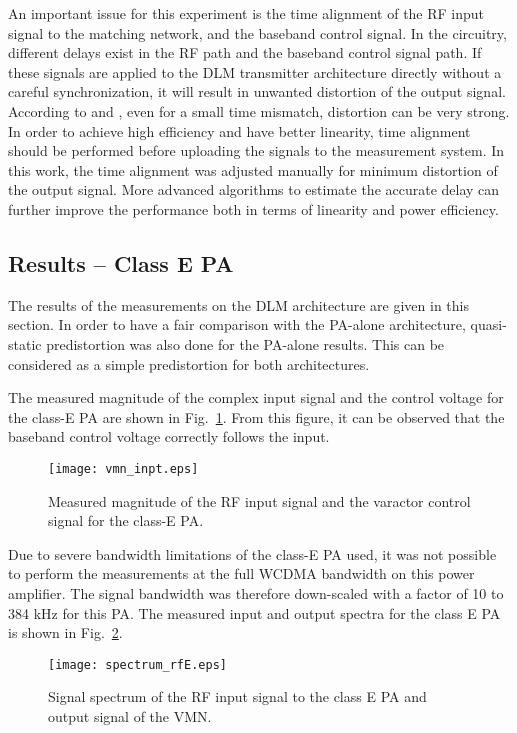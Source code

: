 \documentclass[10pt,journal]{IEEEtran}
\begin{document}
An important issue for this experiment is the time alignment of the RF input signal to the matching network, and the baseband control signal. In the circuitry, different delays exist in the RF path and the baseband control signal path. If these signals are applied to the DLM transmitter architecture directly without a careful synchronization, it will result in unwanted distortion of the output signal. According to \cite{raab1} and \cite{rudolph}, even for a small time mismatch, distortion can be very strong. In order to achieve high efficiency and have better linearity, time alignment should be performed before uploading the signals to the measurement system. In this work, the time alignment was adjusted manually for minimum distortion of the output signal. More advanced algorithms to estimate the accurate delay can further improve the performance both in terms of linearity and power efficiency.

\subsection{Results -- Class E PA}
The results of the measurements on the DLM architecture are given in this section. In order to have a fair comparison with the PA-alone architecture, quasi-static predistortion was also done for the PA-alone results. This can be considered as a simple predistortion for both architectures.

The measured magnitude of the complex input signal and the control voltage for the class-E PA are shown in Fig.~\ref{vc_inpt}. From this figure, it can be observed that the baseband control voltage correctly follows the input.

\begin{figure}
\centering
\texttt{[image: vmn\_inpt.eps]}
\caption{Measured magnitude of the RF input signal and the varactor control
signal for the class-E PA.}
\label{vc_inpt}
\end{figure}

Due to severe bandwidth limitations of the class-E PA used, it was not possible to perform the measurements at the full WCDMA bandwidth on this power amplifier. The signal bandwidth was therefore down-scaled with a factor of 10 to 384 kHz for this PA. The measured input and output spectra for the class E PA is shown in Fig.~\ref{spct_rfE}.

\begin{figure}
\centering
\texttt{[image: spectrum\_rfE.eps]}
\caption{Signal spectrum of the RF input signal to the class E PA and output
signal of the VMN.}
\label{spct_rfE}
\end{figure}
\end{document}
